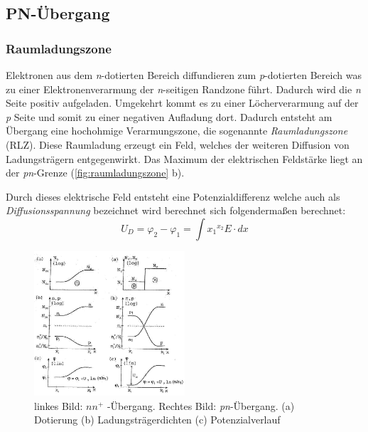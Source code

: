 
\subsection{PN-Übergang }\label{k5:pn}
    
    \subsubsection{Raumladungszone}\label{k5:rlz}
	Elektronen aus dem \textit{n}-dotierten Bereich diffundieren zum \textit{p}-dotierten Bereich was zu einer Elektronenverarmung der \textit{n}-seitigen Randzone führt. 
	Dadurch wird die \textit{n} Seite positiv aufgeladen. Umgekehrt kommt es zu einer Löcherverarmung auf der \textit{p} Seite und somit zu einer negativen Aufladung dort. 
    Dadurch entsteht am Übergang eine hochohmige Verarmungszone, die sogenannte \textit{Raumladungszone} (RLZ).
    Diese Raumladung erzeugt ein Feld, welches der weiteren Diffusion von Ladungsträgern entgegenwirkt. Das Maximum der elektrischen Feldstärke liegt an der \textit{pn}-Grenze (\ref{fig:raumladungszone} b).
    
    Durch dieses elektrische Feld entsteht eine Potenzialdifferenz welche auch als \textit{Diffusionsspannung} bezeichnet wird berechnet sich folgendermaßen berechnet:
    \begin{equation}
        U_D = \varphi_2 - \varphi_1 = \int{x_1}^{x_2} E \cdot dx
    \end{equation}

           \begin{figure}[H]
        \centering
        \includegraphics[width=0.5\textwidth]{fig/pnuebergang.jpg}
        \caption{linkes Bild: $nn^+$ -Übergang. Rechtes Bild: \textit{pn}-Übergang. (a) Dotierung (b) Ladungsträgerdichten (c) Potenzialverlauf}
        \label{fig:pnuebergang}
    \end{figure}
    
